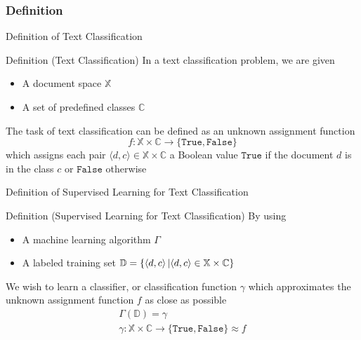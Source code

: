 \subsubsection{Definition}
\begin{frame}{Definition of Text Classification}
\begin{block}{Definition (Text Classification)}
In a text classification problem, we are given
	\begin{itemize}
	\item A document space $\mathbb{X}$
	\item A set of predefined classes $\mathbb{C}$
	\end{itemize}
The task of text classification can be defined as an unknown assignment function
	\begin{equation*}
	f: \mathbb{X} \times \mathbb{C} \rightarrow \{\mathtt{True},\mathtt{False}\}
	\end{equation*}
which assigns each pair $\langle d,c \rangle \in \mathbb{X} \times \mathbb{C}$ a Boolean value $\mathtt{True}$ if the document $d$ is in the class $c$ or $\mathtt{False}$ otherwise\cite{Feldman2006tm,Manning2008tm}
\end{block}
\end{frame}

\begin{frame}{Definition of Supervised Learning for Text Classification}
\begin{block}{Definition (Supervised Learning for Text Classification)}
By using
	\begin{itemize}
	\item A machine learning algorithm $\Gamma$
	\item A labeled training set $\mathbb{D}=\{\langle d,c \rangle \operatorname*{|} \langle d,c \rangle \in \mathbb{X} \times \mathbb{C}\}$
	\end{itemize}
We wish to learn a \alert{classifier}, or classification function $\gamma$ which approximates the unknown assignment function $f$ as close as possible\cite{Sebastiani2002mltm,Feldman2006tm,Manning2008tm}
	\begin{equation*}
	\begin{gathered}
	\Gamma(\mathbb{D}) = \gamma \\
	\gamma: \mathbb{X} \times \mathbb{C} \rightarrow \{\mathtt{True},\mathtt{False}\} \approx f
	\end{gathered}
	\end{equation*}
\end{block}
\end{frame}

